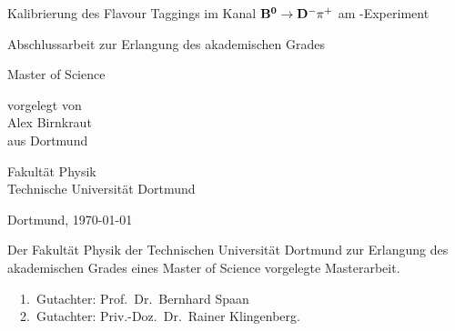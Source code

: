 
\begin{titlepage}

\vspace*{20ex}
{%
\Huge \sffamily \bfseries 
\begin{center}
Kalibrierung des Flavour Taggings im Kanal $\mathbf{{{B}^0}\rightarrow{\ensuremath{{D}^-}}{\ensuremath{{\pi}^+}}}$ am \lhcb-Experiment
\end{center} 
}%

\begin{otherlanguage}{german}
{%
\LARGE \sffamily %
\begin{center}
Abschlussarbeit zur Erlangung des akademischen Grades\\
\end{center}
}

{%
\LARGE \sffamily %
\begin{center}
Master of Science
\end{center}
}

\vspace{5ex}


{%
\Large \rmfamily
\begin{center}
vorgelegt von \\[0.8ex]
Alex Birnkraut \\[0.8ex]
aus Dortmund
\end{center}
}
\vspace{5ex}
{%
\Large \rmfamily
\begin{center}
Fakultät Physik\\
Technische Universität Dortmund
\end{center}
}
\vspace{4ex}
{%
\Large \rmfamily
\begin{center}
Dortmund, \today
\end{center}
}

\clearpage
\thispagestyle{empty}
\vspace*{\fill}
\noindent Der Fakultät Physik der Technischen Universität Dortmund zur Erlangung
des akademischen Grades eines Master of Science vorgelegte
Masterarbeit.\\

\parbox{\textwidth}{
  1.~Gutachter: Prof.~Dr.~Bernhard Spaan \\
  2.~Gutachter: Priv.-Doz.~Dr.~Rainer Klingenberg.\\
}
\end{otherlanguage}
\end{titlepage}
\setcounter{page}{1}